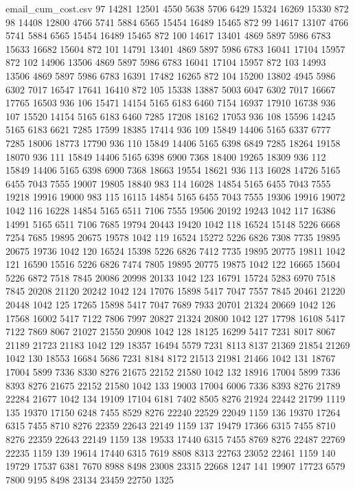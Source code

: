 \begin{filecontents*}{email_cum_cost.csv}
97	14281	12501	4550	5638	5706	6429	15324	16269	15330	872
98	14408	12800	4766	5741	5884	6565	15454	16489	15465	872
99	14617	13107	4766	5741	5884	6565	15454	16489	15465	872
100	14617	13401	4869	5897	5986	6783	15633	16682	15604	872
101	14791	13401	4869	5897	5986	6783	16041	17104	15957	872
102	14906	13506	4869	5897	5986	6783	16041	17104	15957	872
103	14993	13506	4869	5897	5986	6783	16391	17482	16265	872
104	15200	13802	4945	5986	6302	7017	16547	17641	16410	872
105	15338	13887	5003	6047	6302	7017	16667	17765	16503	936
106	15471	14154	5165	6183	6460	7154	16937	17910	16738	936
107	15520	14154	5165	6183	6460	7285	17208	18162	17053	936
108	15596	14245	5165	6183	6621	7285	17599	18385	17414	936
109	15849	14406	5165	6337	6777	7285	18006	18773	17790	936
110	15849	14406	5165	6398	6849	7285	18264	19158	18070	936
111	15849	14406	5165	6398	6900	7368	18400	19265	18309	936
112	15849	14406	5165	6398	6900	7368	18663	19554	18621	936
113	16028	14726	5165	6455	7043	7555	19007	19805	18840	983
114	16028	14854	5165	6455	7043	7555	19218	19916	19000	983
115	16115	14854	5165	6455	7043	7555	19306	19916	19072	1042
116	16228	14854	5165	6511	7106	7555	19506	20192	19243	1042
117	16386	14991	5165	6511	7106	7685	19794	20443	19420	1042
118	16524	15148	5226	6668	7254	7685	19895	20675	19578	1042
119	16524	15272	5226	6826	7308	7735	19895	20675	19736	1042
120	16524	15398	5226	6826	7412	7735	19895	20775	19811	1042
121	16590	15516	5226	6826	7474	7805	19895	20775	19875	1042
122	16665	15604	5226	6872	7518	7845	20086	20998	20133	1042
123	16791	15724	5283	6970	7518	7845	20208	21120	20242	1042
124	17076	15898	5417	7047	7557	7845	20461	21220	20448	1042
125	17265	15898	5417	7047	7689	7933	20701	21324	20669	1042
126	17568	16002	5417	7122	7806	7997	20827	21324	20800	1042
127	17798	16108	5417	7122	7869	8067	21027	21550	20908	1042
128	18125	16299	5417	7231	8017	8067	21189	21723	21183	1042
129	18357	16494	5579	7231	8113	8137	21369	21854	21269	1042
130	18553	16684	5686	7231	8184	8172	21513	21981	21466	1042
131	18767	17004	5899	7336	8330	8276	21675	22152	21580	1042
132	18916	17004	5899	7336	8393	8276	21675	22152	21580	1042
133	19003	17004	6006	7336	8393	8276	21789	22284	21677	1042
134	19109	17104	6181	7402	8505	8276	21924	22442	21799	1119
135	19370	17150	6248	7455	8529	8276	22240	22529	22049	1159
136	19370	17264	6315	7455	8710	8276	22359	22643	22149	1159
137	19479	17366	6315	7455	8710	8276	22359	22643	22149	1159
138	19533	17440	6315	7455	8769	8276	22487	22769	22235	1159
139	19614	17440	6315	7619	8808	8313	22763	23052	22461	1159
140	19729	17537	6381	7670	8988	8498	23008	23315	22668	1247
141	19907	17723	6579	7800	9195	8498	23134	23459	22750	1325

\end{filecontents*}
